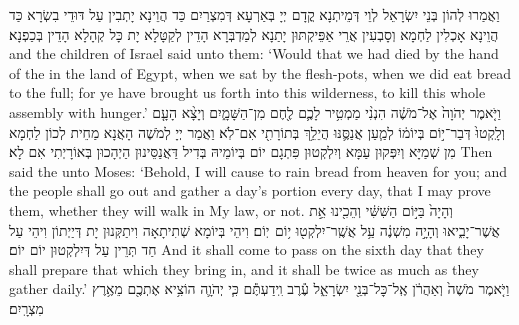 {וַאֲמַרוּ לְהוֹן בְּנֵי יִשְׂרָאֵל לְוֵי דְּמֵיתְנָא קֳדָם יְיָ בְּאַרְעָא דְּמִצְרַיִם כַּד הֲוֵינָא יָתְבִין עַל דּוּדֵי בִשְׂרָא כַּד הֲוֵינָא אָכְלִין לַחְמָא וְסָבְעִין אֲרֵי אַפֵּיקְתּוּן יָתַנָא לְמַדְבְּרָא הָדֵין לְקַטָּלָא יָת כָּל קְהָלָא הָדֵין בְּכַפְנָא׃}
{and the children of Israel said unto them: ‘Would that we had died by the hand of the \lord\space in the land of Egypt, when we sat by the flesh-pots, when we did eat bread to the full; for ye have brought us forth into this wilderness, to kill this whole assembly with hunger.’}{}
{וַיֹּ֤אמֶר יְהֹוָה֙ אֶל־מֹשֶׁ֔ה הִנְנִ֨י מַמְטִ֥יר לָכֶ֛ם לֶ֖חֶם מִן־הַשָּׁמָ֑יִם וְיָצָ֨א הָעָ֤ם וְלָֽקְטוּ֙ דְּבַר־י֣וֹם בְּיוֹמ֔וֹ לְמַ֧עַן אֲנַסֶּ֛נּוּ הֲיֵלֵ֥ךְ בְּתוֹרָתִ֖י אִם־לֹֽא׃
}
{וַאֲמַר יְיָ לְמֹשֶׁה הָאֲנָא מַחֵית לְכוֹן לַחְמָא מִן שְׁמַיָּא וְיִפְּקוּן עַמָּא וְיִלְקְטוּן פִּתְגָם יוֹם בְּיוֹמֵיהּ בְּדִיל דַּאֲנַסֵּינוּן הַיְהָכוּן בְּאוֹרָיְתִי אִם לָא׃}
{Then said the \lord\space unto Moses: ‘Behold, I will cause to rain bread from heaven for you; and the people shall go out and gather a day’s portion every day, that I may prove them, whether they will walk in My law, or not.}{}
{וְהָיָה֙ בַּיּ֣וֹם הַשִּׁשִּׁ֔י וְהֵכִ֖ינוּ אֵ֣ת אֲשֶׁר־יָבִ֑יאוּ וְהָיָ֣ה מִשְׁנֶ֔ה עַ֥ל אֲשֶֽׁר־יִלְקְט֖וּ י֥וֹם \pasek  יֽוֹם׃
}
{וִיהֵי בְּיוֹמָא שְׁתִיתָאָה וִיתַקְּנוּן יָת דְּיַיְתוֹן וִיהֵי עַל חַד תְּרֵין עַל דְּיִלְקְטוּן יוֹם יוֹם׃}
{And it shall come to pass on the sixth day that they shall prepare that which they bring in, and it shall be twice as much as they gather daily.’}{}
{וַיֹּ֤אמֶר מֹשֶׁה֙ וְאַהֲרֹ֔ן אֶֽל־כׇּל־בְּנֵ֖י יִשְׂרָאֵ֑ל עֶ֕רֶב וִֽידַעְתֶּ֕ם כִּ֧י יְהֹוָ֛ה הוֹצִ֥יא אֶתְכֶ֖ם מֵאֶ֥רֶץ מִצְרָֽיִם׃
}
